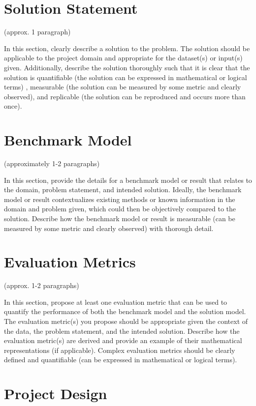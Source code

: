 \documentclass[11pt]{article}
\begin{document}
\section{Solution Statement}

(approx. 1 paragraph)

In this section, clearly describe a solution to the problem. The solution should be applicable to the project domain and appropriate for the dataset(s) or input(s) given. Additionally, describe the solution thoroughly such that it is clear that the solution is quantifiable (the solution can be expressed in mathematical or logical terms) , measurable (the solution can be measured by some metric and clearly observed), and replicable (the solution can be reproduced and occurs more than once).

\section{Benchmark Model}

(approximately 1-2 paragraphs)

In this section, provide the details for a benchmark model or result that relates to the domain, problem statement, and intended solution. Ideally, the benchmark model or result contextualizes existing methods or known information in the domain and problem given, which could then be objectively compared to the solution. Describe how the benchmark model or result is measurable (can be measured by some metric and clearly observed) with thorough detail.

\section{Evaluation Metrics}

(approx. 1-2 paragraphs)

In this section, propose at least one evaluation metric that can be used to quantify the performance of both the benchmark model and the solution model. The evaluation metric(s) you propose should be appropriate given the context of the data, the problem statement, and the intended solution. Describe how the evaluation metric(s) are derived and provide an example of their mathematical representations (if applicable). Complex evaluation metrics should be clearly defined and quantifiable (can be expressed in mathematical or logical terms).

\section{Project Design}
\end{document}
